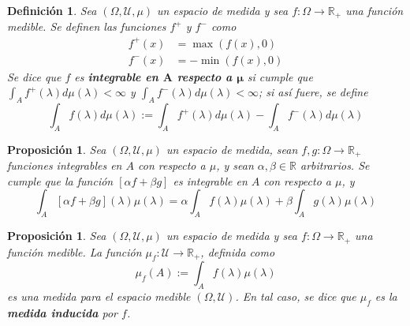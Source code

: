 \documentclass[12pt,letterpaper]{book}
\newtheorem{definicion}{Definición}[chapter]
\newtheorem{proposicion}[teorema]{Proposición}
\newcommand{\R}{\mathbb{R}}
\begin{document}
\begin{definicion}
Sea $(\Omega, \mathcal{U}, \mu)$ un espacio de medida y sea $f:\Omega \rightarrow \R_+$ una función medible. Se definen las funciones $f^{+}$ y $f^{-}$ como
\begin{align*}
f^{+}(x) &= \max (f(x), 0 ) \\
f^{-}(x) &= -\min (f(x), 0 )
\end{align*}
Se dice que $f$ es \textbf{integrable en $\boldsymbol{A}$ respecto a $\boldsymbol{\mu}$} si cumple que $\int_A f^{+}(\lambda) d\mu(\lambda) < \infty$ y $\int_A f^{-}(\lambda) d\mu(\lambda) < \infty$; si así fuere, se define
\begin{equation}
\int_A f(\lambda) d\mu(\lambda) := \int_A f^{+}(\lambda) d\mu(\lambda) - \int_A f^{-}(\lambda) d\mu(\lambda)
\end{equation}
\end{definicion}

\begin{proposicion}
Sea $(\Omega, \mathcal{U}, \mu)$ un espacio de medida, sean $f,g:\Omega \rightarrow \R_+$ funciones integrables en $A$ con respecto a $\mu$, y sean $\alpha, \beta \in \R$ arbitrarios. 
%
Se cumple que la función $[\alpha f + \beta g]$ es integrable en $A$ con respecto a $\mu$, y
\begin{equation}
\int_A \left[ \alpha f + \beta g \right] (\lambda) \mu(\lambda) = \alpha \int_A f(\lambda) \mu(\lambda) + \beta \int_A g(\lambda) \mu(\lambda)
\end{equation}
\end{proposicion}

\begin{proposicion}
Sea $(\Omega, \mathcal{U}, \mu)$ un espacio de medida y sea $f:\Omega \rightarrow \R_+$ una función medible. La función $\mu_f:\mathcal{U}\rightarrow\R_+$, definida como
\begin{equation}
\mu_f(A) := \int_A f(\lambda) \mu(\lambda)
\end{equation}
es una medida para el espacio medible $(\Omega, \mathcal{U})$. En tal caso, se dice que $\mu_f$ es la \textbf{medida inducida} por $f$.
\end{proposicion}

\end{document}
